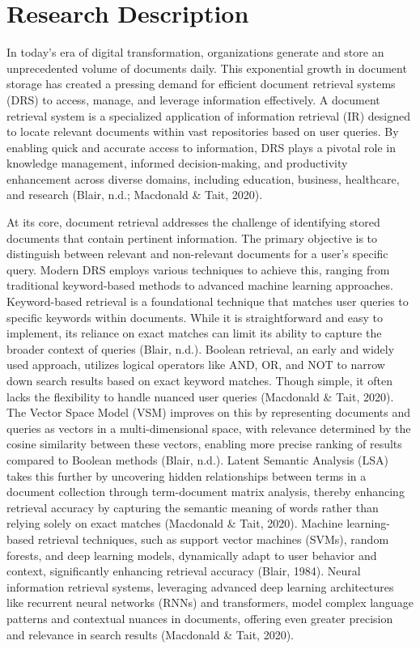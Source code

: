 \chapter{Research Description}\label{ch:description}

In today’s era of digital transformation, organizations generate and store an unprecedented volume of documents daily. This exponential growth in document storage has created a pressing demand for efficient document retrieval systems (DRS) to access, manage, and leverage information effectively. A document retrieval system is a specialized application of information retrieval (IR) designed to locate relevant documents within vast repositories based on user queries. By enabling quick and accurate access to information, DRS plays a pivotal role in knowledge management, informed decision-making, and productivity enhancement across diverse domains, including education, business, healthcare, and research (Blair, n.d.; Macdonald \& Tait, 2020).

At its core, document retrieval addresses the challenge of identifying stored documents that contain pertinent information. The primary objective is to distinguish between relevant and non-relevant documents for a user’s specific query. Modern DRS employs various techniques to achieve this, ranging from traditional keyword-based methods to advanced machine learning approaches. Keyword-based retrieval is a foundational technique that matches user queries to specific keywords within documents. While it is straightforward and easy to implement, its reliance on exact matches can limit its ability to capture the broader context of queries (Blair, n.d.). Boolean retrieval, an early and widely used approach, utilizes logical operators like AND, OR, and NOT to narrow down search results based on exact keyword matches. Though simple, it often lacks the flexibility to handle nuanced user queries (Macdonald \& Tait, 2020). The Vector Space Model (VSM) improves on this by representing documents and queries as vectors in a multi-dimensional space, with relevance determined by the cosine similarity between these vectors, enabling more precise ranking of results compared to Boolean methods (Blair, n.d.). Latent Semantic Analysis (LSA) takes this further by uncovering hidden relationships between terms in a document collection through term-document matrix analysis, thereby enhancing retrieval accuracy by capturing the semantic meaning of words rather than relying solely on exact matches (Macdonald \& Tait, 2020). Machine learning-based retrieval techniques, such as support vector machines (SVMs), random forests, and deep learning models, dynamically adapt to user behavior and context, significantly enhancing retrieval accuracy (Blair, 1984). Neural information retrieval systems, leveraging advanced deep learning architectures like recurrent neural networks (RNNs) and transformers, model complex language patterns and contextual nuances in documents, offering even greater precision and relevance in search results (Macdonald \& Tait, 2020).

